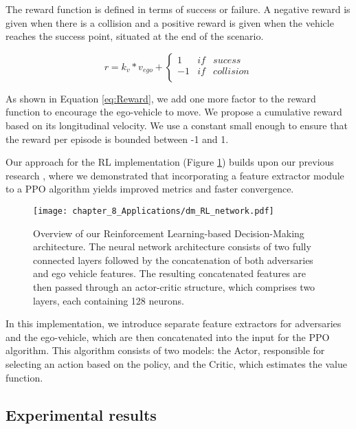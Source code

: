 The reward function is defined in terms of success or failure. A negative reward is given when there is a collision and a positive reward is given when the vehicle reaches the success point, situated at the end of the scenario.

\begin{equation}
	r = k_v * v_{ego} + \left\lbrace\begin{array}{lcc}
		1 & if & sucess \\ 
		-1 & if & collision \\
	\end{array}\right.
	\label{eq:Reward}
\end{equation}

As shown in Equation \ref{eq:Reward}, we add one more factor to the reward function to encourage the ego-vehicle to move. We propose a cumulative reward based on its longitudinal velocity. We use a constant small enough to ensure that the reward per episode is bounded between -1 and 1.

Our approach for the RL implementation (Figure \ref{fig:chapter_8_Applications/dm_RL_network}) builds upon our previous research \cite{Gutierrez2022}, where we demonstrated that incorporating a feature extractor module to a PPO algorithm yields improved metrics and faster convergence. 

\begin{figure}[h]
	\centering
	\texttt{[image: chapter\_8\_Applications/dm\_RL\_network.pdf]}
	\captionsetup{justification=justified}
	\caption[Overview of our Reinforcement Learning-based Decision-Making architecture]{Overview of our Reinforcement Learning-based Decision-Making architecture. The neural network architecture consists of two fully connected layers followed by the concatenation of both adversaries and ego vehicle features. The resulting concatenated features are then passed through an actor-critic structure, which comprises two layers, each containing 128 neurons.}	
	\label{fig:chapter_8_Applications/dm_RL_network}
\end{figure}

In this implementation, we introduce separate feature extractors for adversaries and the ego-vehicle, which are then concatenated into the input for the PPO algorithm. This algorithm consists of two models: the Actor, responsible for selecting an action based on the policy, and the Critic, which estimates the value function.

\subsection{Experimental results}
\label{subsec:8_decision_making_experimental_results}

